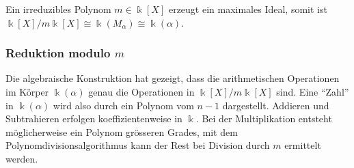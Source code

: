 Ein irreduzibles Polynom $m\in\Bbbk[X]$ erzeugt ein maximales Ideal,
somit ist $\Bbbk[X]/m\Bbbk[X]\cong \Bbbk(M_\alpha) \cong \Bbbk(\alpha)$.

\subsubsection{Reduktion modulo $m$}
Die algebraische Konstruktion hat gezeigt, dass die arithmetischen
Operationen im Körper $\Bbbk(\alpha)$ genau die Operationen 
in $\Bbbk[X]/m\Bbbk[X]$ sind.
Eine ``Zahl'' in $\Bbbk(\alpha)$ wird also durch ein Polynom vom 
$n-1$ dargestellt.
Addieren und Subtrahieren erfolgen koeffizientenweise in $\Bbbk$.
Bei der Multiplikation entsteht möglicherweise ein Polynom grösseren
Grades, mit dem Polynomdivisionsalgorithmus kann der Rest bei Division
durch $m$ ermittelt werden.

